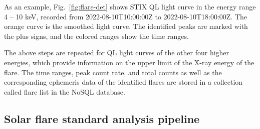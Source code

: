 \documentclass[referee]{aa} %
\begin{document}
As an example, Fig.~\ref{fig:flare-det} shows STIX QL light curve in the energy range 4 -- 10 keV, recorded from 2022-08-10T10:00:00Z to 2022-08-10T18:00:00Z.  The orange curve is the smoothed light curve.  The identified peaks are marked with the plus signs, and the colored ranges show the time ranges.

The above steps are repeated for QL light curves of the other four higher energies, which provide information on the upper limit of the X-ray energy of the flare.
The time ranges, peak count rate, and total counts as well as the corresponding ephemeris data of the identified flares are  stored in a collection called flare list in the NoSQL database.


\subsection{Solar flare standard analysis pipeline}
\end{document}
